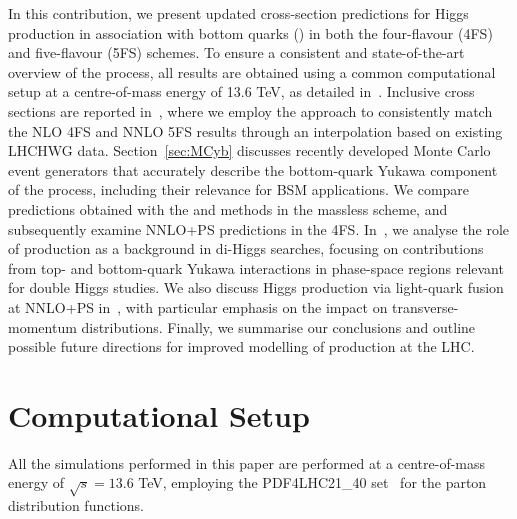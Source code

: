 \documentclass[11pt,a4paper]{article}
\begin{document}
In this contribution, we present updated cross-section predictions for Higgs production in association with bottom quarks (\bbH{}) in both the four-flavour (4FS) and five-flavour (5FS) schemes. To ensure a consistent and state-of-the-art overview of the process, all results are obtained using a common computational setup at a centre-of-mass energy of 13.6 TeV, as detailed in~. Inclusive cross sections are reported in~, where we employ the \nlonnllpart{} approach to consistently match the NLO 4FS and NNLO 5FS results through an interpolation based on existing LHCHWG data. 
Section~\ref{sec:MCyb} discusses recently developed Monte Carlo event generators that accurately describe the bottom-quark Yukawa component of the \bbH{} process, including their relevance for BSM applications. We compare predictions obtained with the \minnlo{} and \GENEVA{} methods in the massless scheme, and subsequently examine NNLO+PS predictions in the 4FS.
In~, we analyse the role of \bbH{} production as a background in di-Higgs searches, focusing on contributions from top- and bottom-quark Yukawa interactions in phase-space regions relevant for double Higgs studies.
We also discuss Higgs production via light-quark fusion at NNLO+PS in~, with particular emphasis on the impact on transverse-momentum distributions.
Finally, we summarise our conclusions and outline possible future directions for improved modelling of \bbH{} production at the LHC.

\section{Computational Setup}\label{sec:setup}
All the simulations performed in this paper are performed at a centre-of-mass energy of $\sqrt{s}=13.6$ TeV, employing the PDF4LHC21\_40 set~\cite{PDF4LHCWorkingGroup:2022cjn} for the parton distribution functions. 
\end{document}
